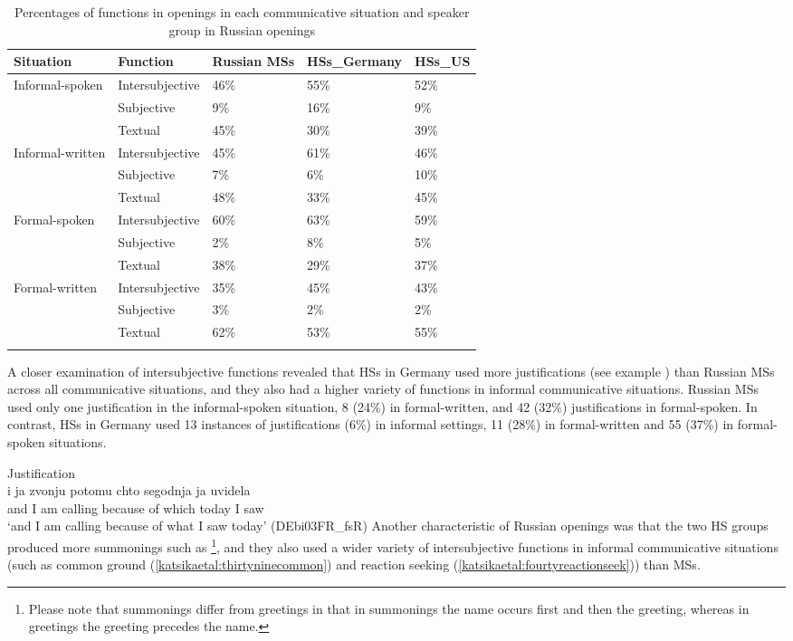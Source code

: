 \documentclass[output=paper,colorlinks,citecolor=brown]{langscibook}
\begin{document}
\begin{table}
\caption{Percentages of functions in openings in each communicative situation and speaker group in Russian openings}
\label{tab:katsikaetal:Russianfunctiosopen}
 \begin{tabularx}{\textwidth}{llYYY}
   \lsptoprule
    Situation & Function & Russian MSs & HSs\_Germany & HSs\_US\\
    
 \midrule
  Informal-spoken & Intersubjective & 46\% & 55\% & 52\%\\
                  & Subjective & 9\% & 16\% & 9\%\\
                  & Textual & 45\% & 30\% & 39\% \\
  Informal-written & Intersubjective & 45\% & 61\% & 46\%\\
                  & Subjective & 7\% & 6\% & 10\%\\
                  & Textual & 48\% & 33\% & 45\%\\
  Formal-spoken   & Intersubjective & 60\% & 63\% & 59\%\\
                  & Subjective & 2\% & 8\% & 5\%\\
                  & Textual & 38\% & 29\% & 37\%\\
  Formal-written  & Intersubjective & 35\% & 45\% & 43\%\\
                  & Subjective & 3\% & 2\% & 2\%\\
                  & Textual & 62\% & 53\% & 55\%\\
  \lspbottomrule
  \end{tabularx}
  \end{table}

 A closer examination of intersubjective functions revealed that HSs in Germany used more justifications (see example ) than Russian MSs across all communicative situations, and they also had a higher variety of functions in informal communicative situations. Russian MSs used only one justification in the informal-spoken situation, 8 (24\%) in formal-written, and 42 (32\%) justifications in formal-spoken. In contrast, HSs in Germany used 13 instances of justifications (6\%) in informal settings, 11 (28\%) in formal-written and 55 (37\%) in formal-spoken situations.

\ea Justification\\ \label{katsikaetal:thirtysevenjustification}
\gll i ja zvonju potomu chto segodnja ja uvidela\\
     and I am calling because of which today I saw\\
\glt ‘and I am calling because of what I saw today’ (DEbi03FR\_fsR)
\z
\newpage
Another characteristic of Russian openings was that the two HS groups produced more summonings such as \footnote{Please note that summonings differ from greetings in that in summonings the name occurs first and then the greeting, whereas in greetings the greeting precedes the name.}, and they also used a wider variety of intersubjective functions in informal communicative situations (such as common ground (\ref{katsikaetal:thirtyninecommon}) and reaction seeking (\ref{katsikaetal:fourtyreactionseek})) than MSs.
\end{document}
